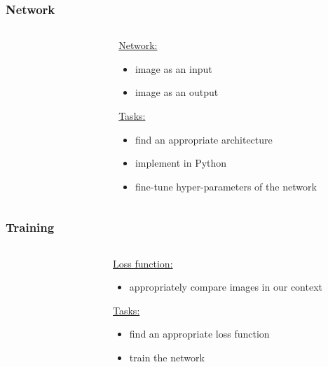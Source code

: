 \documentclass[18pt]{beamer}
\begin{document}
\begin{frame}[t]
  \frametitle{Network}
    \begin{columns}[t]
      \begin{column}{0.5\textwidth}
        \begin{figure}
          \centering
          
        \end{figure}
        
      \end{column}
      \begin{column}{0.5\textwidth}
        \large{\underline{Network:}}
        \begin{itemize}
        \item image as an input
        \item image as an output
        \end{itemize}
        \vspace{2cm}
        \large{\underline{Tasks:}}
        \begin{itemize}
        \item find an appropriate architecture
        \item implement in Python
        \item fine-tune hyper-parameters of the network
        \end{itemize}
      \end{column}
  \end{columns}
\end{frame}


\begin{frame}[t]
  \frametitle{Training}
  \begin{columns}[t]
    \begin{column}{0.5\textwidth}
      \begin{figure}[htb]
        \centering
        
      \end{figure}
      
    \end{column}
    \begin{column}{0.5\textwidth}
      \large{\underline{Loss function:}}
      \begin{itemize}
      \item appropriately compare images in our context
      \end{itemize}
      \vspace{2cm}
      \large{\underline{Tasks:}}
      \begin{itemize}
      \item find an appropriate loss function
      \item train the network
      \end{itemize}
    \end{column}
  \end{columns}
\end{frame}
\end{document}
